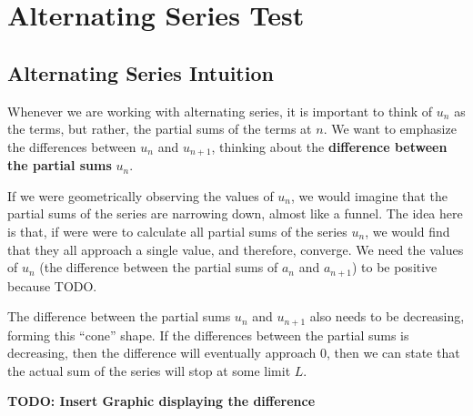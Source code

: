 \documentclass{report}
\newtheorem{thm}{Theorem}
\begin{document}
\begin{sloppypar}
\section{Alternating Series Test}

\begin{center}
\end{center}

\subsection{Alternating Series Intuition}
Whenever we are working with alternating series, it is
important to think of $ u_{n} $ as the terms, but rather,
the partial sums of the terms at $ n $.
We want to emphasize the differences between $ u_{n} $ and $ u_{n+1}$, thinking about  the \textbf{
  difference between the partial sums}  $ u_{n}$.

\par If we were geometrically observing the
values of $ u_{n} $, we would imagine that the partial
sums of the series are narrowing down, almost like a
funnel. The idea here is that, if were were to
calculate all partial sums of the series $ u_{n} $,
we would find that they all approach a single value,
and therefore, converge. We need the
values of $ u_{n} $ (the difference between the
partial sums of $ a_{n} $ and $ a_{n+1} $) to be positive because TODO.
\par The difference between the partial sums $ u_{n} $ and
$ u_{n+1} $ also needs to be decreasing, forming
this ``cone'' shape. If the differences between the
partial sums is decreasing, then the difference
will eventually approach 0, then we can state
that the actual sum of the series will stop at
some limit $ L $.
\begin{center}
  \textbf{TODO: Insert Graphic displaying the difference}
\end{center}


\end{sloppypar}
\end{document}
